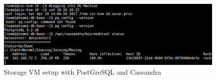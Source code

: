 \begin{enumerate}
\begin{enumerate}[label={}]
\begin{figure}
      \centering
      \includegraphics[scale=0.4]{screenshots/ssh-db.png}
      \caption{Storage VM setup with PostGreSQL and Cassandra}
      \label{ssh-db}
    \end{figure}
  \end{enumerate}
\end{enumerate}





